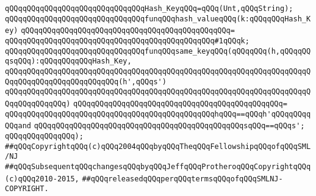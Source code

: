 \newline
\verb|qQQqqQQqqQQqqQQqqQQqqQQqqQQqqQQqHash_KeyqQQq=qQQq(Unt,qQQqString);|\newline
\newline
\verb|qQQqqQQqqQQqqQQqqQQqqQQqqQQqqQQqfunqQQqhash_valueqQQq(k:qQQqqQQqHash_Key)|\newline
\verb|qQQqqQQqqQQqqQQqqQQqqQQqqQQqqQQqqQQqqQQqqQQqqQQq=|\newline
\verb|qQQqqQQqqQQqqQQqqQQqqQQqqQQqqQQqqQQqqQQqqQQqqQQq#1qQQqk;|\newline
\newline
\verb|qQQqqQQqqQQqqQQqqQQqqQQqqQQqqQQqfunqQQqsame_keyqQQq(qQQqqQQq(h,qQQqqQQqsqQQq):qQQqqQQqqQQqHash_Key,|\newline
\verb|qQQqqQQqqQQqqQQqqQQqqQQqqQQqqQQqqQQqqQQqqQQqqQQqqQQqqQQqqQQqqQQqqQQqqQQqqQQqqQQqqQQqqQQqqQQqqQQq(h',qQQqs')|\newline
\verb|qQQqqQQqqQQqqQQqqQQqqQQqqQQqqQQqqQQqqQQqqQQqqQQqqQQqqQQqqQQqqQQqqQQqqQQqqQQqqQQqqQQq)|\newline
\verb|qQQqqQQqqQQqqQQqqQQqqQQqqQQqqQQqqQQqqQQqqQQqqQQq=|\newline
\verb|qQQqqQQqqQQqqQQqqQQqqQQqqQQqqQQqqQQqqQQqqQQqqQQqhqQQq==qQQqh'qQQqqQQqqQQqand|\newline
\verb|qQQqqQQqqQQqqQQqqQQqqQQqqQQqqQQqqQQqqQQqqQQqqQQqsqQQq==qQQqs';|\newline
\verb|qQQqqQQqqQQqqQQq);|\newline
\newline
\newline
\verb|##qQQqCopyrightqQQq(c)qQQq2004qQQqbyqQQqTheqQQqFellowshipqQQqofqQQqSML/NJ|\newline
\verb|##qQQqSubsequentqQQqchangesqQQqbyqQQqJeffqQQqProtheroqQQqCopyrightqQQq(c)qQQq2010-2015,|\newline
\verb|##qQQqreleasedqQQqperqQQqtermsqQQqofqQQqSMLNJ-COPYRIGHT.|\newline

